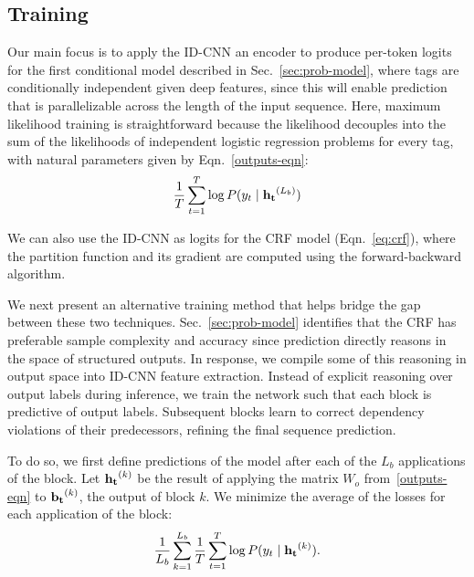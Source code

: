 \subsection{Training}


Our main focus is to apply the ID-CNN an encoder to produce per-token logits for the first conditional model described in Sec.~\ref{sec:prob-model}, where tags are conditionally independent given deep features, since this will enable prediction that is parallelizable across the length of the input sequence. Here, maximum likelihood training is straightforward because the likelihood decouples into the sum of the likelihoods of independent logistic regression problems for every tag, with natural parameters given by Eqn.~\eqref{outputs-eqn}:
\begin{equation}
\frac{1}{T}\sum_{t=1}^T \log P(y_t \mid {\bf h_t}^{(L_b)}) \label{eq:loss}
\end{equation}

We can also use the ID-CNN as logits for the CRF model (Eqn.~\eqref{eq:crf}), where the partition function and its gradient are computed using the forward-backward algorithm. 

We next present an alternative training method that helps bridge the gap between these two techniques. Sec.~\ref{sec:prob-model} identifies that the CRF has preferable sample complexity and accuracy since prediction directly reasons in the space of structured outputs. In response, we compile some of this reasoning in output space into ID-CNN feature extraction. Instead of explicit reasoning over output labels during inference, we train the network such that each block is predictive of output labels. Subsequent blocks learn to correct dependency violations of their predecessors, refining the final sequence prediction.

To do so, we first define predictions of the model after each of the $L_b$ applications of the block. Let ${\bf h_t}^{(k)}$ be the result of applying the matrix $W_o$ from~\eqref{outputs-eqn} to ${\bf b_t}^{(k)}$, the output of block $k$. We minimize the average of the losses for each application of the block: 
\begin{align}
\frac{1}{L_b}\sum_{k=1}^{L_b} \frac{1}{T}\sum_{t=1}^T \log P(y_t \mid {\bf h_t}^{(k)}). \label{eq:avg-loss}
\end{align}

